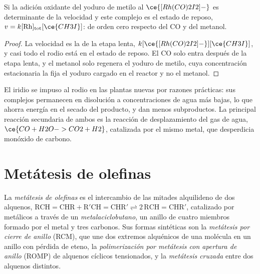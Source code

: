 \begin{proposition}\label{prop:b3:homogeneous-catalysis:monsanto-rate}
Si la adición oxidante del yoduro de metilo al $\ce{[Rh(CO)2I2]-}$ es determinante de la velocidad y
este complejo es el estado de reposo, $v = k[\mathrm{Rh}]_{\mathrm{tot}}[\ce{CH3I}]$: de orden cero respecto del CO y del
metanol.
\end{proposition}

\begin{proof}
La velocidad es la de la etapa lenta, $k[\ce{[Rh(CO)2I2]-}][\ce{CH3I}]$, y casi todo el rodio
está en el estado de reposo. El CO solo entra después de la etapa lenta, y el metanol solo
regenera el yoduro de metilo, cuya concentración estacionaria la fija el yoduro
cargado en el reactor y no el metanol.
\end{proof}

El iridio se impuso al rodio en las plantas nuevas por razones prácticas: sus complejos permanecen
en disolución a concentraciones de agua más bajas, lo que ahorra energía en el secado del
producto, y dan menos subproductos. La principal reacción secundaria de ambos es la
reacción de desplazamiento del gas de agua, $\ce{CO + H2O -> CO2 + H2}$, catalizada por el mismo metal, que desperdicia
monóxido de carbono.

\section{Metátesis de olefinas}

\begin{definition}\label{def:b3:homogeneous-catalysis:metathesis}
La \emph{metátesis de olefinas} es el intercambio de las
mitades alquilideno de dos alquenos, $\mathrm{RCH{=}CHR + R'CH{=}CHR' \rightleftharpoons 2\,RCH{=}CHR'}$, catalizado por
 metálicos a través de un \emph{metalaciclobutano},
un anillo de cuatro miembros formado por el metal y tres carbonos. Sus formas sintéticas son la
\emph{metátesis por cierre de anillo} (RCM), que une
dos extremos alquénicos de una molécula en un anillo con pérdida de eteno, la
\emph{polimerización por metátesis con apertura de anillo}
(ROMP) de alquenos cíclicos tensionados, y la \emph{metátesis
cruzada} entre dos alquenos distintos.
\end{definition}

